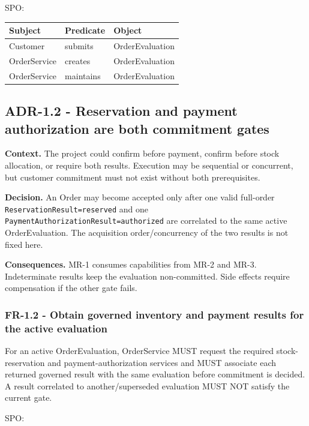 \documentclass[
  10pt,
]{article}
\begin{document}
SPO:

\begin{longtable}[]{@{}lll@{}}
\toprule\noalign{}
Subject & Predicate & Object \\
\midrule\noalign{}
\endhead
\bottomrule\noalign{}
\endlastfoot
Customer & submits & OrderEvaluation \\
OrderService & creates & OrderEvaluation \\
OrderService & maintains & OrderEvaluation \\
\end{longtable}

\subsection{ADR-1.2 - Reservation and payment authorization are both
commitment
gates}\label{adr-12---reservation-and-payment-authorization-are-both-commitment-gates}

\textbf{Context.} The project could confirm before payment, confirm
before stock allocation, or require both results. Execution may be
sequential or concurrent, but customer commitment must not exist without
both prerequisites.

\textbf{Decision.} An Order may become accepted only after one valid
full-order \texttt{ReservationResult=reserved} and one
\texttt{PaymentAuthorizationResult=authorized} are correlated to the
same active OrderEvaluation. The acquisition order/concurrency of the
two results is not fixed here.

\textbf{Consequences.} MR-1 consumes capabilities from MR-2 and MR-3.
Indeterminate results keep the evaluation non-committed. Side effects
require compensation if the other gate fails.

\subsubsection{FR-1.2 - Obtain governed inventory and payment results
for the active
evaluation}\label{fr-12---obtain-governed-inventory-and-payment-results-for-the-active-evaluation}

For an active OrderEvaluation, OrderService MUST request the required
stock-reservation and payment-authorization services and MUST associate
each returned governed result with the same evaluation before commitment
is decided. A result correlated to another/superseded evaluation MUST
NOT satisfy the current gate.

SPO:
\end{document}
